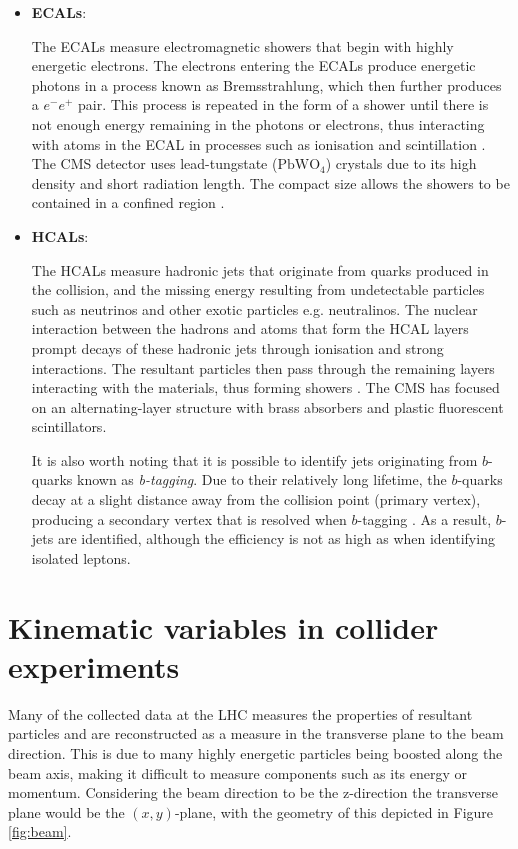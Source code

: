 \begin{itemize}
  \item \textbf{ECALs}: \par
  The ECALs measure electromagnetic showers that begin with highly energetic electrons. The electrons entering the ECALs produce energetic photons in a process known as Bremsstrahlung, which then further produces a $e^{-}e^{+}$ pair. This process is repeated in the form of a shower until there is not enough energy remaining in the photons or electrons, thus interacting with atoms in the ECAL in processes such as ionisation and scintillation \cite{thomson2013modern}. The CMS detector uses lead-tungstate ($\text{PbWO}_4$) crystals due to its high density and short radiation length. The compact size allows the showers to be contained in a confined region \cite{chatrchyan2008cms}. 
  
  \item \textbf{HCALs}: \par
  The HCALs measure hadronic jets that originate from quarks produced in the collision, and the missing energy resulting from undetectable particles such as neutrinos and other exotic particles e.g. neutralinos. The nuclear interaction between the hadrons and atoms that form the HCAL layers prompt decays of these hadronic jets through ionisation and strong interactions. The resultant particles then pass through the remaining layers interacting with the materials, thus forming showers \cite{thomson2013modern}. The CMS has focused on an alternating-layer structure with brass absorbers and plastic fluorescent scintillators. \par
  
  It is also worth noting that it is possible to identify jets originating from $b$-quarks known as \textit{b-tagging}. Due to their relatively long lifetime, the $b$-quarks decay at a slight distance away from the collision point (primary vertex), producing a secondary vertex that is resolved when $b$-tagging \cite{thomson2013modern}. As a result, $b$-jets are identified, although the efficiency is not as high as when identifying isolated leptons. 
\end{itemize}




\section{Kinematic variables in collider experiments}
Many of the collected data at the LHC measures the properties of resultant particles and are reconstructed as a measure in the transverse plane to the beam direction. This is due to many highly energetic particles being boosted along the beam axis, making it difficult to measure components such as its energy or momentum. Considering the beam direction to be the z-direction the transverse plane would be the $(x,y)$-plane, with the geometry of this depicted in Figure \ref{fig:beam}. \\

